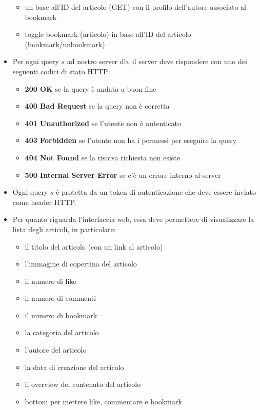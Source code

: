 \documentclass{article}
\begin{document}
\begin{itemize}
    \begin{itemize}
        \item un base all'ID del articolo (GET) con il profilo dell'autore associato al bookmark
        \item toggle bookmark (articolo) in base all'ID del articolo (bookmark/unbookmark)
    \end{itemize}
    \item Per ogni query $s$ ad nostro server db, il server deve rispondere con uno dei seguenti codici di stato HTTP:
    \begin{itemize}
        \item \textbf{200 OK} se la query è andata a buon fine
        \item \textbf{400 Bad Request} se la query non è corretta
        \item \textbf{401 Unauthorized} se l'utente non è autenticato
        \item \textbf{403 Forbidden} se l'utente non ha i permessi per eseguire la query
        \item \textbf{404 Not Found} se la risorsa richiesta non esiste
        \item \textbf{500 Internal Server Error} se c'è un errore interno al server
    \end{itemize}
    \item Ogni query $s$ è protetta da un token di autenticazione che deve essere inviato come header HTTP.
    \item Per quanto riguarda l'interfaccia web, essa deve permettere di visualizzare la lista degli articoli, in particolare:
    \begin{itemize}
        \item il titolo del articolo (con un link al articolo)
        \item l'immagine di copertina del articolo
        \item il numero di like
        \item il numero di commenti
        \item il numero di bookmark
        \item la categoria del articolo
        \item l'autore del articolo
        \item la data di creazione del articolo
        \item il overview del contenuto del articolo
        \item bottoni per mettere like, commentare e bookmark
    \end{itemize}

\end{itemize}
\end{document}
